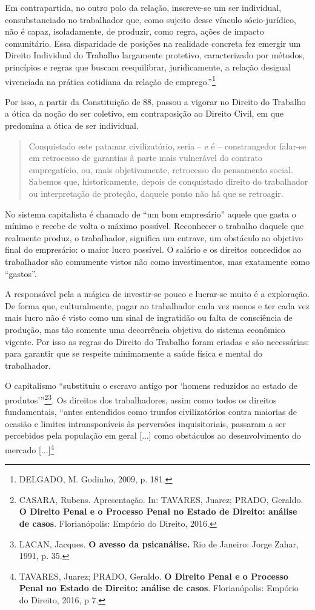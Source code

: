 Em contrapartida, no outro polo da relação, inscreve-se um ser
individual, consubstanciado no trabalhador que, como sujeito desse
vínculo sócio-jurídico, não é capaz, isoladamente, de produzir, como
regra, ações de impacto comunitário. Essa disparidade de posições na
realidade concreta fez emergir um Direito Individual do Trabalho
largamente protetivo, caracterizado por métodos, princípios e regras que
buscam reequilibrar, juridicamente, a relação desigual vivenciada na
prática cotidiana da relação de emprego.''\footnote{DELGADO, M. Godinho,
  2009, p. 181.}

Por isso, a partir da Constituição de 88, passou a vigorar no Direito do
Trabalho a ótica da noção do ser coletivo, em contraposição ao Direito
Civil, em que predomina a ótica de ser individual.

\begin{quote}
Conquistado este patamar civilizatório, seria -- e é -- constrangedor
falar-se em retrocesso de garantias à parte mais vulnerável do contrato
empregatício, ou, mais objetivamente, retrocesso do pensamento social.
Sabemos que, historicamente, depois de conquistado direito do
trabalhador ou interpretação de proteção, daquele ponto não há que se
retroagir.
\end{quote}

No sistema capitalista é chamado de ``um bom empresário'' aquele que
gasta o mínimo e recebe de volta o máximo possível. Reconhecer o
trabalho daquele que realmente produz, o trabalhador, significa um
entrave, um obstáculo ao objetivo final do empresário: o maior lucro
possível. O salário e os direitos concedidos ao trabalhador são
comumente vistos não como investimentos, mas exatamente como ``gastos''.

A responsável pela a mágica de investir-se pouco e lucrar-se muito é a
exploração. De forma que, culturalmente, pagar ao trabalhador cada vez
menos e ter cada vez mais lucro não é visto como um sinal de ingratidão
ou falta de consciência de produção, mas tão somente uma decorrência
objetiva do sistema econômico vigente. Por isso as regras do Direito do
Trabalho foram criadas e são necessárias: para garantir que se respeite
minimamente a saúde física e mental do trabalhador.

O capitalismo ``substituiu o escravo antigo por `homens reduzidos ao
estado de produtos'''\footnote{CASARA, Rubens. Apresentação. In:
  TAVARES, Juarez; PRADO, Geraldo. \textbf{O Direito Penal e o Processo
  Penal no Estado de Direito: análise de casos}. Florianópolis: Empório
  do Direito, 2016.}\footnote{LACAN, Jacques. \textbf{O avesso da
  psicanálise.} Rio de Janeiro: Jorge Zahar, 1991, p. 35.}. Os direitos
dos trabalhadores, assim como todos os direitos fundamentais, ``antes
entendidos como trunfos civilizatórios contra maiorias de ocasião e
limites intransponíveis às perversões inquisitoriais, passaram a ser
percebidos pela população em geral {[}...{]} como obstáculos ao
desenvolvimento do mercado {[}...{]}\footnote{TAVARES, Juarez; PRADO,
  Geraldo. \textbf{O Direito Penal e o Processo Penal no Estado de
  Direito: análise de casos}. Florianópolis: Empório do Direito, 2016, p
  7.}

